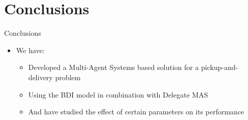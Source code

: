 \section{Conclusions}

\begin{frame}{Conclusions}
    \begin{itemize}
        \item We have:
        \begin{itemize}
            \item Developed a Multi-Agent Systems based solution for a pickup-and-delivery problem
            \item Using the BDI model in combination with Delegate MAS
            \item And have studied the effect of certain parameters on its performance
        \end{itemize}
    \end{itemize}
\end{frame}

